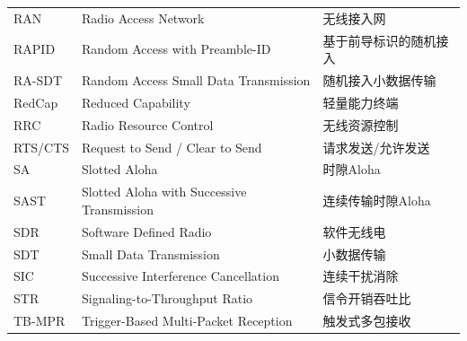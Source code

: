 \begin{longtable}{p{2.5cm}p{8cm}p{5cm}}
	RAN & Radio Access Network & 无线接入网 \\
	RAPID & Random Access with Preamble-ID & 基于前导标识的随机接入 \\
	RA-SDT & Random Access Small Data Transmission & 随机接入小数据传输 \\
	RedCap & Reduced Capability & 轻量能力终端 \\
	RRC & Radio Resource Control & 无线资源控制 \\
	RTS/CTS & Request to Send / Clear to Send & 请求发送/允许发送 \\
	SA & Slotted Aloha & 时隙Aloha \\
	SAST & Slotted Aloha with Successive Transmission & 连续传输时隙Aloha \\
	SDR & Software Defined Radio & 软件无线电 \\
	SDT & Small Data Transmission & 小数据传输 \\
	SIC & Successive Interference Cancellation & 连续干扰消除 \\
	STR & Signaling-to-Throughput Ratio & 信令开销吞吐比 \\
	TB-MPR & Trigger-Based Multi-Packet Reception & 触发式多包接收 \\

\end{longtable}